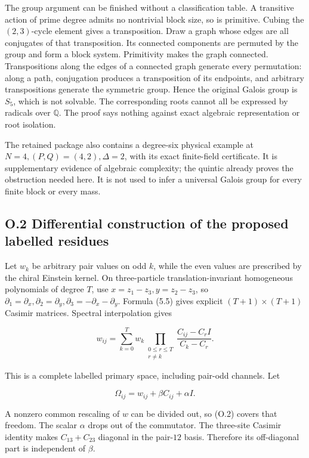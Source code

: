 \documentclass[a4paper,11pt]{article}
\numberwithin{equation}{section}
\begin{document}
The group argument can be finished without a classification table. A transitive action of prime degree admits no nontrivial block size, so is primitive. Cubing the \((2,3)\)-cycle element gives a transposition. Draw a graph whose edges are all conjugates of that transposition. Its connected components are permuted by the group and form a block system. Primitivity makes the graph connected. Transpositions along the edges of a connected graph generate every permutation: along a path, conjugation produces a transposition of its endpoints, and arbitrary transpositions generate the symmetric group. Hence the original Galois group is \(S_5\), which is not solvable. The corresponding roots cannot all be expressed by radicals over \(\mathbb Q\). The proof says nothing against exact algebraic representation or root isolation.

The retained package also contains a degree-six physical example at \(N=4,(P,Q)=(4,2),\Delta=2\), with its exact finite-field certificate. It is supplementary evidence of algebraic complexity; the quintic already proves the obstruction needed here. It is not used to infer a universal Galois group for every finite block or every mass.

\hypertarget{o.2-differential-construction-of-the-proposed-labelled-residues}{%
\subsection{O.2 Differential construction of the proposed labelled residues}\label{o.2-differential-construction-of-the-proposed-labelled-residues}}

Let \(w_k\) be arbitrary pair values on odd \(k\), while the even values are prescribed by the chiral Einstein kernel. On three-particle translation-invariant homogeneous polynomials of degree \(T\), use \(x=z_1-z_3,y=z_2-z_3\), so \(\partial_1=\partial_x,\partial_2=\partial_y,\partial_3=-\partial_x-\partial_y\). Formula (5.5) gives explicit \((T+1)\times(T+1)\) Casimir matrices. Spectral interpolation gives

\[
w_{ij}=\sum_{k=0}^Tw_k
\prod_{\substack{0\le r\le T\\r\ne k}}\frac{C_{ij}-C_rI}{C_k-C_r}.
\tag{O.1}
\]

This is a complete labelled primary space, including pair-odd channels. Let

\[
\Omega_{ij}=w_{ij}+\beta C_{ij}+\alpha I.
\tag{O.2}
\]

A nonzero common rescaling of \(w\) can be divided out, so (O.2) covers that freedom. The scalar \(\alpha\) drops out of the commutator. The three-site Casimir identity makes \(C_{13}+C_{23}\) diagonal in the pair-\(12\) basis. Therefore its off-diagonal part is independent of \(\beta\).
\end{document}
